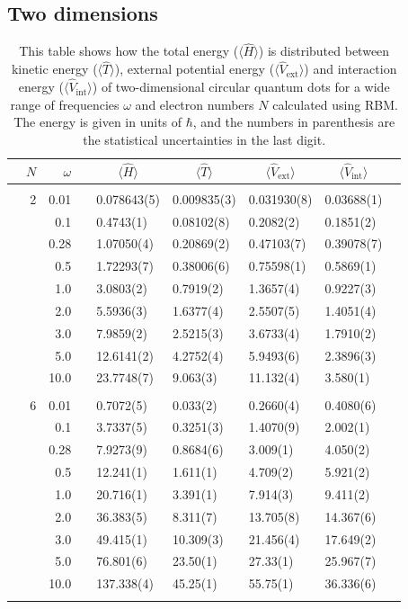 \subsection{Two dimensions}
\begin{table}[H]
	\caption{This table shows how the total energy ($\langle\hat{H}\rangle$) is distributed between kinetic energy ($\langle\hat{T}\rangle$), external potential energy ($\langle\hat{V}_{\text{ext}}\rangle$) and interaction energy ($\langle\hat{V}_{\text{int}}\rangle$) of two-dimensional circular quantum dots for a wide range of frequencies $\omega$ and electron numbers $N$ calculated using RBM. The energy is given in units of $\hbar$, and the numbers in parenthesis are the statistical uncertainties in the last digit.}
	\label{tab:splitfrequencyQDRBM}
	\begin{tabularx}{\textwidth}{R{1cm}rrcR{2.3cm}R{2.3cm}R{2.3cm}R{2.3cm}R{1cm}} \hline\hline
		\makecell{\\ \phantom{$N$}} & $N$ & $\omega$ &&  &  &  &  & \\ \hline \\
		&2 & 0.01 && 0.078643(5) & 0.009835(3) & 0.031930(8) & 0.03688(1) \\
		&& 0.1 && 0.4743(1) & 0.08102(8) & 0.2082(2) & 0.1851(2) \\
		&& 0.28 && 1.07050(4) & 0.20869(2) & 0.47103(7) & 0.39078(7) \\
		&& 0.5 && 1.72293(7) & 0.38006(6) & 0.75598(1) & 0.5869(1)\\
		&& 1.0 && 3.0803(2) & 0.7919(2) & 1.3657(4) & 0.9227(3)\\
		&& 2.0 && 5.5936(3) & 1.6377(4) & 2.5507(5) & 1.4051(4) \\
		&& 3.0 && 7.9859(2) & 2.5215(3) & 3.6733(4) & 1.7910(2) \\ 
		&& 5.0 && 12.6141(2) & 4.2752(4) & 5.9493(6) & 2.3896(3) \\
		&& 10.0 && 23.7748(7) & 9.063(3) & 11.132(4) & 3.580(1) \\
		\hdashline \\
		
		&6 & 0.01 && 0.7072(5) & 0.033(2) & 0.2660(4) & 0.4080(6) \\
		&& 0.1 && 3.7337(5) & 0.3251(3) & 1.4070(9) & 2.002(1) \\
		&& 0.28 && 7.9273(9) & 0.8684(6) & 3.009(1) & 4.050(2) \\
		&& 0.5 && 12.241(1) & 1.611(1) & 4.709(2) & 5.921(2)\\
		&& 1.0 && 20.716(1) & 3.391(1) & 7.914(3) & 9.411(2)\\
		&& 2.0 && 36.383(5) & 8.311(7) & 13.705(8) & 14.367(6) \\
		&& 3.0 && 49.415(1) & 10.309(3) & 21.456(4) & 17.649(2) \\ 
		&& 5.0 && 76.801(6) & 23.50(1) & 27.33(1) & 25.967(7) \\
		&& 10.0 && 137.338(4) & 45.25(1) & 55.75(1) & 36.336(6) \\
		\hdashline \\
		

\end{tabularx}
\end{table}
